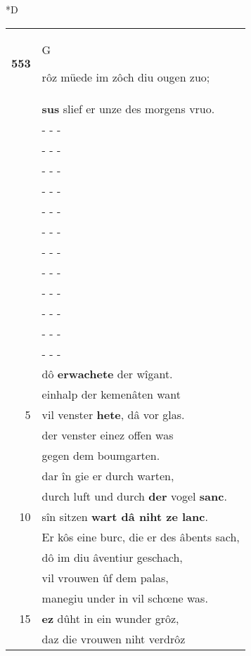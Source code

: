 \documentclass[8pt,a4paper,notitlepage]{article}
\begin{document}
\begin{table}[ht]
\begin{minipage}[t]{0.5\linewidth}
\small
\begin{center}*D
\end{center}
\begin{tabular}{rl}
\textbf{553} & \begin{large}G\end{large}rôz müede im zôch diu ougen zuo;\\ 
 & \textbf{sus} slief er unze des morgens vruo.\\ 
 & \multicolumn{1}{l}{ - - - }\\ 
 & \multicolumn{1}{l}{ - - - }\\ 
 & \multicolumn{1}{l}{ - - - }\\ 
 & \multicolumn{1}{l}{ - - - }\\ 
 & \multicolumn{1}{l}{ - - - }\\ 
 & \multicolumn{1}{l}{ - - - }\\ 
 & \multicolumn{1}{l}{ - - - }\\ 
 & \multicolumn{1}{l}{ - - - }\\ 
 & \multicolumn{1}{l}{ - - - }\\ 
 & \multicolumn{1}{l}{ - - - }\\ 
 & \multicolumn{1}{l}{ - - - }\\ 
 & \multicolumn{1}{l}{ - - - }\\ 
 & dô \textbf{erwachete} der wîgant.\\ 
 & einhalp der kemenâten want\\ 
5 & vil venster \textbf{hete}, dâ vor glas.\\ 
 & der venster einez offen was\\ 
 & gegen dem boumgarten.\\ 
 & dar în gie er durch warten,\\ 
 & durch luft und durch \textbf{der} vogel \textbf{sanc}.\\ 
10 & sîn sitzen \textbf{wart dâ niht ze lanc}.\\ 
 & Er kôs eine burc, die er des âbents sach,\\ 
 & dô im diu âventiur geschach,\\ 
 & vil vrouwen ûf dem palas,\\ 
 & manegiu under in vil schœne was.\\ 
15 & \textbf{ez} dûht in ein wunder grôz,\\ 
 & daz die vrouwen niht verdrôz\\ 

\end{tabular}
\end{minipage}
\end{table}
\end{document}
